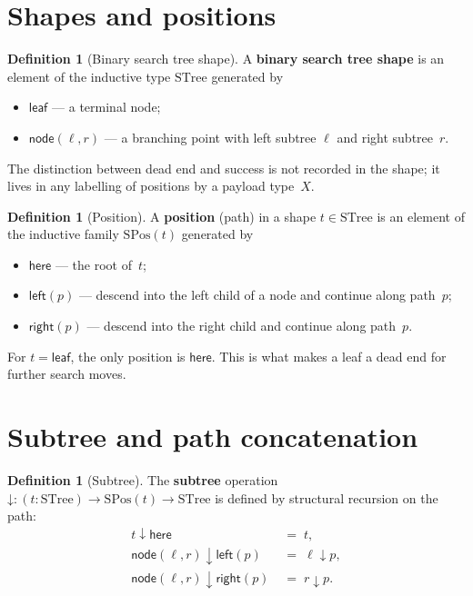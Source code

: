 \documentclass[11pt,a4paper]{article}
\theoremstyle{plain}
\theoremstyle{definition}
\newtheorem{definition}[theorem]{Definition}
\newcommand{\STree}{\mathrm{STree}}
\newcommand{\SPos}{\mathrm{SPos}}
\begin{document}
\section{Shapes and positions}

\begin{definition}[Binary search tree shape]\label{def:stree}
A \textbf{binary search tree shape} is an element of the inductive type
$\STree$ generated by
\begin{itemize}
  \item $\mathsf{leaf}$ --- a terminal node;
  \item $\mathsf{node}(\ell, r)$ --- a branching point with left subtree
        $\ell$ and right subtree~$r$.
\end{itemize}
The distinction between dead end and success is not recorded in the
shape; it lives in any labelling of positions by a payload type~$X$.
\end{definition}

\begin{definition}[Position]\label{def:spos}
A \textbf{position} (path) in a shape $t \in \STree$ is an element of the
inductive family $\SPos(t)$ generated by
\begin{itemize}
  \item $\mathsf{here}$ --- the root of~$t$;
  \item $\mathsf{left}(p)$ --- descend into the left child of a node and
        continue along path~$p$;
  \item $\mathsf{right}(p)$ --- descend into the right child and continue
        along path~$p$.
\end{itemize}
For $t = \mathsf{leaf}$, the only position is $\mathsf{here}$. This is
what makes a leaf a dead end for further search moves.
\end{definition}

\section{Subtree and path concatenation}

\begin{definition}[Subtree]\label{def:sub}
The \textbf{subtree} operation
$\mathord{\downarrow} : (t : \STree) \to \SPos(t) \to \STree$
is defined by structural recursion on the path:
\begin{align}
  t \mathbin{\downarrow} \mathsf{here}
  &\;=\; t, \\
  \mathsf{node}(\ell, r) \mathbin{\downarrow} \mathsf{left}(p)
  &\;=\; \ell \mathbin{\downarrow} p, \\
  \mathsf{node}(\ell, r) \mathbin{\downarrow} \mathsf{right}(p)
  &\;=\; r \mathbin{\downarrow} p.
\end{align}
\end{definition}
\end{document}
